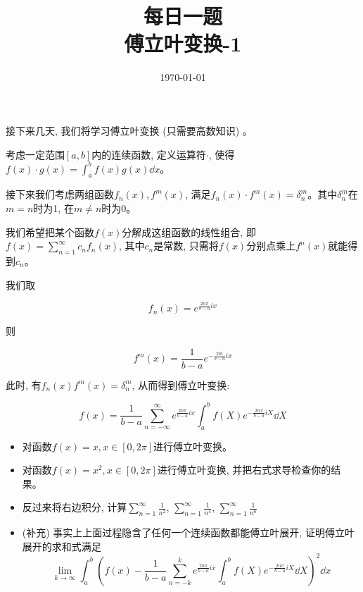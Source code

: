 \documentclass {ctexart}
\title {每日一题\\{\small 傅立叶变换-1}}
\date{\today}
\begin{document}
    \maketitle {}

    接下来几天, 我们将学习傅立叶变换 (只需要高数知识) 。

    考虑一定范围\([a,b]\)内的连续函数, 定义运算符\(\cdot\), 使得\(f(x) \cdot g(x) = \int_a^b f(x)g(x) \dd x\)。

    接下来我们考虑两组函数\(f_n(x),f^m(x)\), 满足\(f_n(x) \cdot f^m(x) = \delta_n^m\)。其中\(\delta_n^m\)在\(m=n\)时为1, 在\(m \neq n\)时为0。

    我们希望把某个函数\(f(x)\)分解成这组函数的线性组合, 即\(f(x) = \sum_{n=1}^\infty c_n f_n(x)\), 其中\(c_n\)是常数, 只需将\(f(x)\)分别点乘上\(f^n(x)\)就能得到\(c_n\)。
    
    我们取

    \[
        f_n(x) = e^{\frac{2n\pi}{b-a} i x}
    \]

    则

    \[
        f^m(x) = \frac{1}{b-a} e^{-\frac{2m}{b-a} i x}
    \]

    此时, 有\(f_n(x)f^m(x) = \delta_n^m\), 从而得到傅立叶变换:

    \begin{equation}
        f(x) = \frac{1}{b-a} \sum_{n=-\infty}^{\infty} e^{\frac{2n\pi}{b-a} i x} \int_a^b f(X)e^{-\frac{2n\pi}{b-a} i X} \dd X
    \end{equation}
        

    \begin{itemize}
        \item 对函数\(f(x) = x, x \in [0,2\pi] \)进行傅立叶变换。
        \item 对函数\(f(x) = x^2, x \in [0,2\pi] \)进行傅立叶变换, 并把右式求导检查你的结果。
        \item 反过来将右边积分, 计算\(\sum_{n=1}^{\infty} \frac{1}{n^2}\), \(\sum_{n=1}^{\infty} \frac{1}{n^4}\), \(\sum_{n=1}^{\infty} \frac{1}{n^6}\)
        \item (补充) 事实上上面过程隐含了任何一个连续函数都能傅立叶展开, 证明傅立叶展开的求和式满足
        \[
            \lim_{k \rightarrow \infty} \int_a^b (f(x) - \frac{1}{b-a}\sum_{n=-k}^{k} e^{\frac{2n\pi}{b-a} i x} \int_a^b f(X)e^{-\frac{2n\pi}{b-a} i X} \dd X )^2 \dd x
        \]
    \end{itemize}
\end{document}
